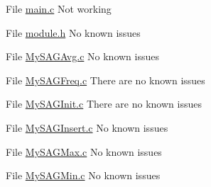 
\begin{DoxyRefList}
\item[File \mbox{\hyperlink{main_8c}{main.c}} ]\label{bug__bug000001}%
%
Not working  
\item[File \mbox{\hyperlink{module_8h}{module.h}} ]\label{bug__bug000002}%
%
No known issues  
\item[File \mbox{\hyperlink{MySAGAvg_8c}{My\+S\+A\+G\+Avg.c}} ]\label{bug__bug000003}%
%
No known issues  
\item[File \mbox{\hyperlink{MySAGFreq_8c}{My\+S\+A\+G\+Freq.c}} ]\label{bug__bug000004}%
%
There are no known issues  
\item[File \mbox{\hyperlink{MySAGInit_8c}{My\+S\+A\+G\+Init.c}} ]\label{bug__bug000005}%
%
There are no known issues  
\item[File \mbox{\hyperlink{MySAGInsert_8c}{My\+S\+A\+G\+Insert.c}} ]\label{bug__bug000006}%
%
No known issues  
\item[File \mbox{\hyperlink{MySAGMax_8c}{My\+S\+A\+G\+Max.c}} ]\label{bug__bug000007}%
%
No known issues  
\item[File \mbox{\hyperlink{MySAGMin_8c}{My\+S\+A\+G\+Min.c}} ]\label{bug__bug000008}%
%
No known issues 
\end{DoxyRefList}